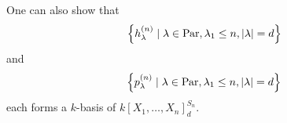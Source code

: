 \begin{rem}
 One can also show that
 \[
  \left\{ h^{(n)}_\lambda \mid \lambda \in \operatorname{Par}, \lambda_1 \leq n, |\lambda| = d \right\}
 \]
 and
 \[
  \left\{ p^{(n)}_\lambda \mid \lambda \in \operatorname{Par}, \lambda_1 \leq n, |\lambda| = d \right\}
 \]
 each forms a $k$-basis of $k[X_1, \ldots, X_n]^{S_n}_d$.
\end{rem}





















